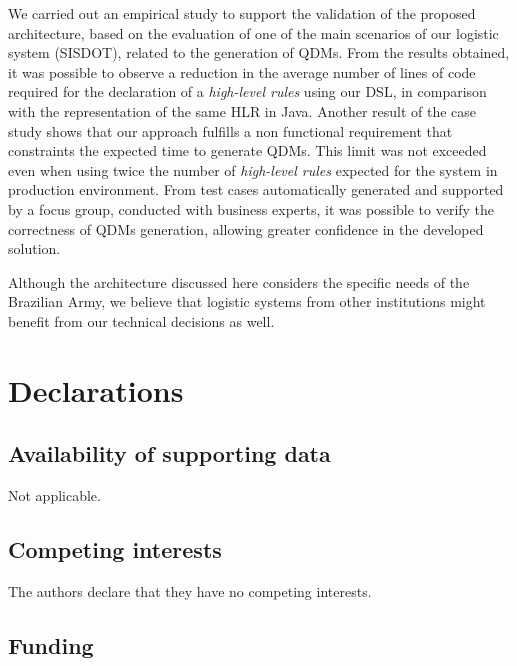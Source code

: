 \documentclass[AMA,STIX1COL,hidelinks]{WileyNJD-v2}
\newcommand{\callers}{\emph{high-level rules}\xspace}
\newcommand{\shc}{HLR\xspace}
\begin{document}
We carried out an empirical study to support the validation of the proposed architecture, based on the evaluation of one of the main scenarios of our logistic system (SISDOT), related to the generation of QDMs. From the results obtained, it was possible to observe a reduction in the average number of lines of code required for the declaration of a \callers using our DSL, in comparison with the representation of the same \shc in Java. Another result of the case study shows that our approach fulfills a non functional requirement that constraints the expected time to generate QDMs. This limit was not exceeded even when using twice the number of \callers expected for the system in production environment. From test cases automatically generated and supported by a focus group, conducted with business experts, it was possible to verify the correctness of QDMs generation, allowing greater confidence in the developed solution.

Although the architecture discussed here considers the specific needs of the Brazilian Army, we believe that logistic systems from other institutions might benefit from our technical decisions as well.







\section{Declarations}

\subsection{Availability of supporting data}

Not applicable.

\subsection{Competing interests}

The authors declare that they have no competing interests.

\subsection{Funding}
\end{document}

